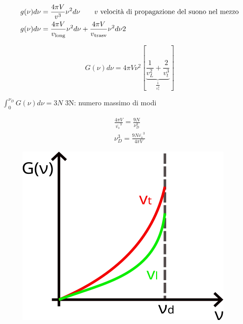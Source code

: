 \documentclass[a4paper,11pt]{report}
\begin{document}
	\begin{displaymath}
		\begin{split}
		&g(\nu)d\nu = \frac{4 \pi V}{v^3}\nu^2 d\nu \qquad \mbox{$v$ velocità di propagazione del suono nel mezzo} \\
	    &g(\nu)d\nu= \frac{4 \pi V}{v\textsubscript{long}}\nu^2 d\nu + \frac{4 \pi V}{v\textsubscript{trasv}}\nu^2 d\nu 2
	    \end{split}
	\end{displaymath}

	\begin{equation}
		G(\nu)d\nu = 4\pi V\nu^2 [\underbrace{\frac{1}{v^2_L}+\frac{2}{v^3_t}}_{\frac{1}{\overline{v^3_s}}}]
	\end{equation}
	
	$\int_{0}^{\nu_D} G(\nu)d\nu = 3N$ \qquad 3N: numero massimo di modi
	
		\begin{gather}
		\frac{4\pi V}{{\overline{v_s}}^3} = \frac{9N}{\nu^3_D} \\
		\nu^3_D = \frac{9N\overline{v_s}^3}{4\pi V} \nonumber
		\end{gather}
\begin{figure}[h]
	\includegraphics[width=0.3\linewidth]{immagini/1}
	\label{fig:1}
\end{figure}
\end{document}
